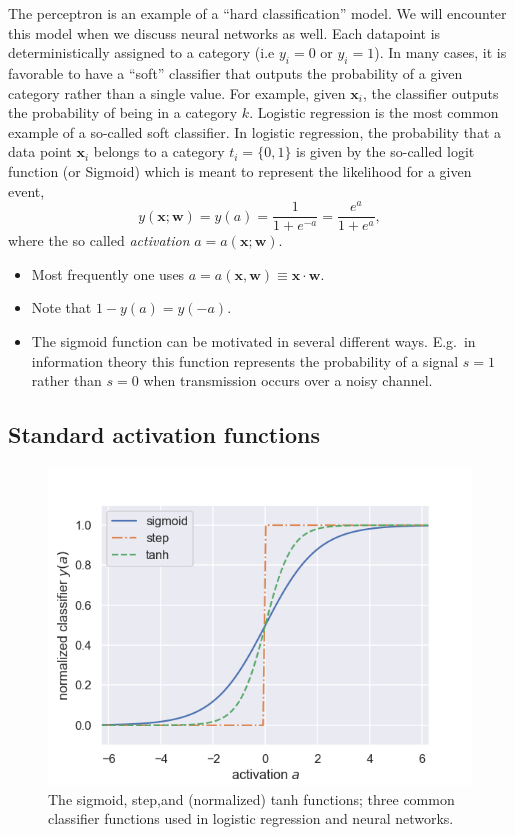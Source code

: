 \documentclass[%
oneside,                 %
final,                   %
10pt]{article}
\begin{document}
The perceptron is an example of a ``hard classification'' model. We
will encounter this model when we discuss neural networks as
well. Each datapoint is deterministically assigned to a category (i.e
$y_i=0$ or $y_i=1$). In many cases, it is favorable to have a ``soft''
classifier that outputs the probability of a given category rather
than a single value. For example, given $\boldsymbol{x}_i$, the classifier
outputs the probability of being in a category $k$.  Logistic regression
is the most common example of a so-called soft classifier. In logistic
regression, the probability that a data point $\boldsymbol{x}_i$
belongs to a category $t_i=\{0,1\}$ is given by the so-called logit function (or Sigmoid) which is meant to represent the likelihood for a given event, 
\[
y(\boldsymbol{x}; \boldsymbol{w}) = y(a) = \frac{1}{1+e^{-a}} = \frac{e^a}{1+e^a},
\]
where the so called \emph{activation} $a = a(\boldsymbol{x}; \boldsymbol{w})$. 

\begin{itemize}
\item Most frequently one uses $a = a(\boldsymbol{x}, \boldsymbol{w}) \equiv \boldsymbol{x} \cdot \boldsymbol{w}$.

\item Note that $1-y(a)= y(-a)$.

\item The sigmoid function can be motivated in several different ways. E.g.~in information theory this function represents the probability of a signal $s=1$ rather than $s=0$ when transmission occurs over a noisy channel.
\end{itemize}

\noindent
\subsection{Standard activation functions}


\begin{figure}[!ht]  %
  \centerline{\includegraphics[width=0.8\linewidth]{fig/logistic_functions.png}}
  \caption{
  The sigmoid, step,and (normalized) tanh functions; three common classifier functions used in logistic regression and neural networks. \label{fig:logistic}
  }
\end{figure}
\end{document}
